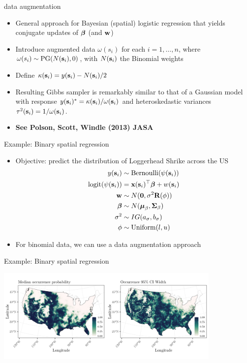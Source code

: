 \begin{frame}{\pg data augmentation}
    \begin{itemize}
	    \item General approach for Bayesian (spatial) logistic regression that yields conjugate updates of $\mbox{\boldmath $ \beta $}$ (and $\textbf{w}$) \pause
	    \item Introduce augmented data $\omega(s_i)$ for each $i = 1, \dots, n$, where $\omega(s_i) \sim \text{PG}(N(\textbf{s}_i), 0)$, with $N(\textbf{s}_i)$ the Binomial weights \pause
	    \item Define $\kappa(\textbf{s}_i) = y(\textbf{s}_i) - N(\textbf{s}_i)/2$ \pause
	    \item Resulting Gibbs sampler is remarkably similar to that of a Gaussian model with response $y(\textbf{s}_i)^\ast = \kappa(\textbf{s}_i)/\omega(\textbf{s}_i)$ and heteroskedastic variances $\tau^2(\textbf{s}_i) = 1/\omega(\textbf{s}_i)$. \pause
	    \item \textbf{See Polson, Scott, Windle (2013) JASA}
    \end{itemize}
\end{frame}

\begin{frame}{Example: Binary spatial regression}
     \begin{itemize}
          \item Objective: predict the distribution of Loggerhead Shrike across the US
          \begin{align*}
              y(\textbf{s}_i) &\sim \text{Bernoulli}(\psi(\textbf{s}_i)) \\
                  \text{logit}(\psi(\textbf{s}_i)) &= \textbf{x}(\textbf{s}_i)^\top\mbox{\boldmath $ \beta $} + w(\textbf{s}_i) \\
                  \textbf{w} &\sim N(\textbf{0}, \sigma^2\textbf{R}(\phi)) \\
                  \mbox{\boldmath $ \beta $} &\sim N(\mbox{\boldmath $\mu$}_{\beta}, \mbox{\boldmath $\Sigma$}_{\beta}) \\
                  \sigma^2 &\sim IG(a_\sigma, b_\sigma) \\ 
                  \phi &\sim \text{Uniform}(l, u)
          \end{align*}
          \item For binomial data, we can use a \pg data augmentation approach
     \end{itemize}
\end{frame}

\begin{frame}{Example: Binary spatial regression}
     \begin{center}
          \includegraphics[width=11cm]{../figures/LOSH-plot.png}
     \end{center}

\end{frame}

